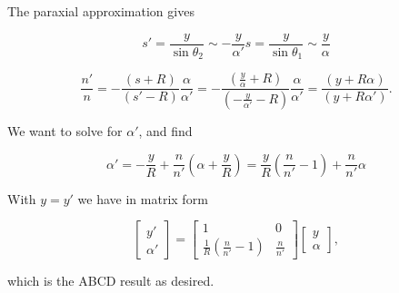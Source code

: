 {The paraxial approximation gives

\begin{subequations}
\begin{equation}\label{eqn:convexNonParaxial:160}
s' = \frac{y}{\sin\theta_2} \sim -\frac{y}{\alpha'}
\end{equation}
\begin{equation}\label{eqn:convexNonParaxial:180}
s = \frac{y}{\sin\theta_1} \sim \frac{y}{\alpha}
\end{equation}
\end{subequations}

\begin{dmath}\label{eqn:convexNonParaxial:200}
\frac{n'}{n}
=
-\frac{
(s + R)
}
{
(s' - R)
}
\frac{
\alpha
}
{
\alpha'
}
=
-\frac{
\left( \frac{y}{\alpha} + R \right)
}
{
\left(-\frac{y}{\alpha'} - R \right)
}
\frac{
\alpha
}
{
\alpha'
}
=
\frac{
\left( y + R \alpha \right)
}
{
\left( y + R \alpha' \right)
}.
\end{dmath}

We want to solve for $\alpha'$, and find

\begin{dmath}\label{eqn:convexNonParaxial:220}
\alpha' 
= -\frac{y}{R} + \frac{n}{n'} \left( \alpha + \frac{y}{R} \right) 
= \frac{y}{R} \left( \frac{n}{n'} - 1 \right) + \frac{n}{n'} \alpha
\end{dmath}

With $y = y'$ we have in matrix form 

\begin{dmath}\label{eqn:convexNonParaxial:240}
\boxed{
\begin{bmatrix}
y' \\
\alpha '
\end{bmatrix}
=
\begin{bmatrix}
1 & 0 \\
\frac{1}{R} \left( \frac{n}{n'} - 1 \right) & \frac{n}{n'} 
\end{bmatrix}
\begin{bmatrix}
y \\
\alpha 
\end{bmatrix},
}
\end{dmath}

which is the ABCD result as desired.
}

